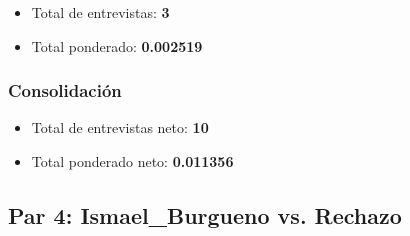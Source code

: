 \documentclass[a4paper,12pt]{article}
\begin{document}
\begin{itemize}
\item Total de entrevistas: \textbf{3}
\item Total ponderado: \textbf{0.002519}
\end{itemize}

\subsubsection*{Consolidación}
\begin{itemize}
\item Total de entrevistas neto: \textbf{10}
\item Total ponderado neto: \textbf{0.011356}
\end{itemize}

\subsection*{Par 4: Ismael_Burgueno vs. Rechazo}
\end{document}
